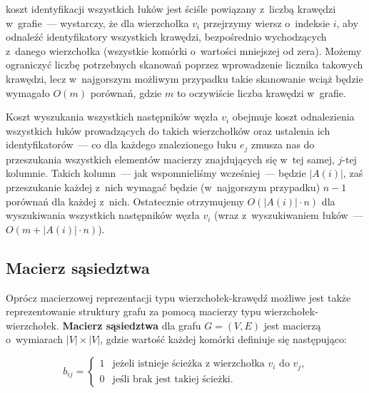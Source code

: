 \begin{myitemize}
	\item koszt identyfikacji wszystkich łuków jest ściśle powiązany z~liczbą krawędzi w~grafie~--- wystarczy, że dla wierzchołka $v_{i}$ przejrzymy wiersz o~indeksie $i$, aby odnaleźć identyfikatory wszystkich krawędzi, bezpośrednio wychodzących z~danego wierzchołka (wszystkie komórki o~wartości mniejszej od zera).
	Możemy ograniczyć liczbę potrzebnych skanowań poprzez wprowadzenie licznika takowych krawędzi, lecz w~najgorszym możliwym przypadku takie skanowanie wciąż będzie wymagało $O \left( m \right)$ porównań, gdzie $m$ to oczywiście liczba krawędzi w~grafie.
	\item Koszt wyszukania wszystkich następników węzła $v_{i}$ obejmuje koszt odnalezienia wszystkich łuków prowadzących do takich wierzchołków oraz ustalenia ich identyfikatorów~--- co dla każdego znalezionego łuku $e_{j}$ zmusza nas do przeszukania wszystkich elementów macierzy znajdujących się w~tej samej, $j$-tej kolumnie.
	Takich kolumn~--- jak wspomnieliśmy wcześniej~--- będzie $\left| A \left( i \right) \right| $, zaś przeszukanie każdej z~nich wymagać będzie (w~najgorszym przypadku) $n-1$ porównań dla każdej z~nich.
	Ostatecznie otrzymujemy $O \left( \left| A \left( i \right) \right| \cdot n \right)$ dla wyszukiwania wszystkich następników węzła $v_{i}$ (wraz z~wyszukiwaniem łuków~--- $O \left( m + \left| A \left( i \right) \right| \cdot n \right)$).
\end{myitemize}



\subsection{Macierz sąsiedztwa}



Oprócz macierzowej reprezentacji typu wierzchołek-krawędź możliwe jest także reprezentowanie struktury grafu za pomocą macierzy typu wierzchołek-wierzchołek.
\textbf{Macierz sąsiedztwa} dla grafu $G = \left( V, E \right)$ jest macierzą o~wymiarach $\left| V \right| \times \left| V \right|$, gdzie wartość każdej komórki definiuje się następująco:

\begin{equation}
	b_{ij}= \left\{ 
	\begin{array}{ll}
	1 & \textrm{jeżeli istnieje ścieżka z~wierzchołka $v_{i}$ do $v_{j}$,}\\
	0 & \textrm{jeśli brak jest takiej ścieżki.}
	\end{array} \right.
\end{equation}

